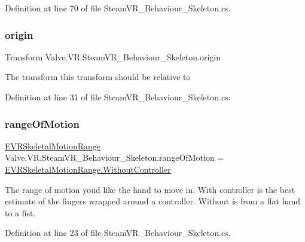 Definition at line 70 of file Steam\+V\+R\+\_\+\+Behaviour\+\_\+\+Skeleton.\+cs.

\mbox{\label{class_valve_1_1_v_r_1_1_steam_v_r___behaviour___skeleton_a9ad8af297aed416cd28d8789ed31ff4f}} 
\subsubsection{\texorpdfstring{origin}{origin}}
{\footnotesize\ttfamily Transform Valve.\+V\+R.\+Steam\+V\+R\+\_\+\+Behaviour\+\_\+\+Skeleton.\+origin}



The transform this transform should be relative to 



Definition at line 31 of file Steam\+V\+R\+\_\+\+Behaviour\+\_\+\+Skeleton.\+cs.

\mbox{\label{class_valve_1_1_v_r_1_1_steam_v_r___behaviour___skeleton_aa59eca01a50adefc4986d5b3abb18e9c}} 
\subsubsection{\texorpdfstring{rangeOfMotion}{rangeOfMotion}}
{\footnotesize\ttfamily \mbox{\hyperlink{namespace_valve_1_1_v_r_affc8d18345f8f5d36f1ae7b4ce534500}{E\+V\+R\+Skeletal\+Motion\+Range}} Valve.\+V\+R.\+Steam\+V\+R\+\_\+\+Behaviour\+\_\+\+Skeleton.\+range\+Of\+Motion = \mbox{\hyperlink{namespace_valve_1_1_v_r_aabb506007a41244de5c315ff5519439fa410e70ab7664c51ec348aecbe772ae58}{E\+V\+R\+Skeletal\+Motion\+Range.\+Without\+Controller}}}



The range of motion you\textquotesingle{}d like the hand to move in. With controller is the best estimate of the fingers wrapped around a controller. Without is from a flat hand to a fist. 



Definition at line 23 of file Steam\+V\+R\+\_\+\+Behaviour\+\_\+\+Skeleton.\+cs.

